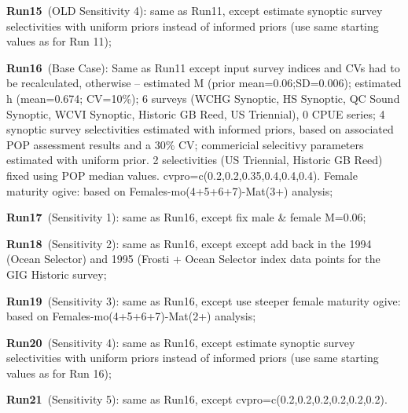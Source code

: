 {\bf Run15}~(OLD Sensitivity 4): same as Run11, except estimate synoptic survey selectivities with uniform priors instead of informed priors (use same starting values as for Run 11); \newline

{\bf Run16}~(Base Case): Same as Run11 except input survey indices and CVs had to be recalculated, otherwise -- estimated M (prior mean=0.06;SD=0.006); estimated h (mean=0.674; CV=10\%); 6 surveys (WCHG Synoptic, HS Synoptic, QC Sound Synoptic, WCVI Synoptic, Historic GB Reed, US Triennial), 0 CPUE series; 4 synoptic survey selectivities estimated with informed priors, based on associated POP assessment results and a 30\% CV; commericial selecitivy parameters estimated with uniform prior. 2 selectivities (US Triennial,  Historic GB Reed) fixed using POP median values. cvpro=c(0.2,0.2,0.35,0.4,0.4,0.4).  Female maturity ogive: based on Females-mo(4+5+6+7)-Mat(3+) analysis; \newline 

{\bf Run17}~(Sensitivity 1): same as Run16, except fix male \& female M=0.06; \newline

{\bf Run18}~(Sensitivity 2): same as Run16, except except add back in the 1994 (Ocean Selector) and 1995 (Frosti + Ocean Selector index data points for the GIG Historic survey; \newline

{\bf Run19}~(Sensitivity 3): same as Run16, except use steeper female maturity ogive: based on Females-mo(4+5+6+7)-Mat(2+) analysis; \newline

{\bf Run20}~(Sensitivity 4): same as Run16, except estimate synoptic survey selectivities with uniform priors instead of informed priors (use same starting values as for Run 16); \newline

{\bf Run21}~(Sensitivity 5): same as Run16, except cvpro=c(0.2,0.2,0.2,0.2,0.2,0.2). \newline
